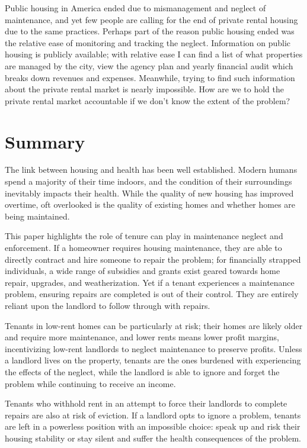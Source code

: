 \documentclass[
  openany]{book}
\begin{document}
Public housing in America ended due to mismanagement and neglect of maintenance, and yet few people are calling for the end of private rental housing due to the same practices. Perhaps part of the reason public housing ended was the relative ease of monitoring and tracking the neglect. Information on public housing is publicly available; with relative ease I can find a list of what properties are managed by the city, view the agency plan and yearly financial audit which breaks down revenues and expenses. Meanwhile, trying to find such information about the private rental market is nearly impossible. How are we to hold the private rental market accountable if we don't know the extent of the problem?

\hypertarget{summary}{%
\chapter{Summary}\label{summary}}

The link between housing and health has been well established. Modern humans spend a majority of their time indoors, and the condition of their surroundings inevitably impacts their health. While the quality of new housing has improved overtime, oft overlooked is the quality of existing homes and whether homes are being maintained.

This paper highlights the role of tenure can play in maintenance neglect and enforcement. If a homeowner requires housing maintenance, they are able to directly contract and hire someone to repair the problem; for financially strapped individuals, a wide range of subsidies and grants exist geared towards home repair, upgrades, and weatherization. Yet if a tenant experiences a maintenance problem, ensuring repairs are completed is out of their control. They are entirely reliant upon the landlord to follow through with repairs.

Tenants in low-rent homes can be particularly at risk; their homes are likely older and require more maintenance, and lower rents means lower profit margins, incentivizing low-rent landlords to neglect maintenance to preserve profits. Unless a landlord lives on the property, tenants are the ones burdened with experiencing the effects of the neglect, while the landlord is able to ignore and forget the problem while continuing to receive an income.

Tenants who withhold rent in an attempt to force their landlords to complete repairs are also at risk of eviction. If a landlord opts to ignore a problem, tenants are left in a powerless position with an impossible choice: speak up and risk their housing stability or stay silent and suffer the health consequences of the problem.
\end{document}
